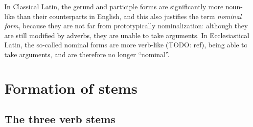 \documentclass[a4paper, oneside]{report}
\newcommand*{\term}[1]{\emph{#1}}
\begin{document}
In Classical Latin, the gerund and participle forms are significantly more noun-like 
than their counterparts in English,
and this also justifies the term \term{nominal form},
because they are not far from prototypically nominalization:
although they are still modified by adverbs,
they are unable to take arguments.
In Ecclesiastical Latin, 
the so-called nominal forms are more verb-like (TODO: ref),
being able to take arguments,
and are therefore no longer ``nominal''.

\section{Formation of stems}\label{sec:verb-inflection.stem}

\subsection{The three verb stems}\label{sec:three-latin-stem}
\end{document}
